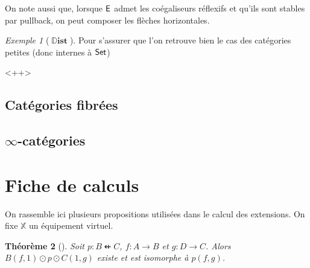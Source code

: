 \documentclass[8pt,a4paper,french,draft]{article}
\newcommand{\bb}[1]{\mathbb{#1}}
\newcommand{\cat}[1]{\textcat{#1}}
\newcommand{\textcat}[1]{{\normalfont\textsf{#1}}}
\DeclareMathOperator{\Dist}{\bb{D}\textbf{ist}}
\theoremstyle{plain}
\newtheorem{theorem}{Théorème}[section]
\theoremstyle{definition}
\theoremstyle{remark}
\newtheorem{example}[theorem]{Exemple}
\begin{document}
On note aussi que, lorsque $\cat{E}$ admet les coégaliseurs réflexifs et qu'ils sont stables par pullback, on peut composer les flèches horizontales. 

\begin{example}[$\Dist$]
    Pour s'assurer que l'on retrouve bien le cas des catégories petites (donc internes à $\cat{Set}$)
\end{example}

<++>

\subsection{Catégories fibrées}

\cite{borceux2}

\subsection{\texorpdfstring{$\infty$}{∞}-catégories}

\clearpage
\appendix

\section{Fiche de calculs}

On rassemble ici plusieurs propositions utilisées dans le calcul des extensions. On fixe $\mathbb{X}$ un équipement virtuel.

\begin{theorem}[{\cite[Theorem 7.16]{cs10}}]
    Soit $p : B \nvleftarrow C$, $f : A \to B$ et $g : D \to C$. Alors $B(f, 1) \odot p \odot C(1, g)$ existe et est isomorphe à $p(f, g)$.
\end{theorem}

\clearpage

\nocite{*}
\printbibliography[heading=bibintoc]

\clearpage
\printindex
\end{document}
